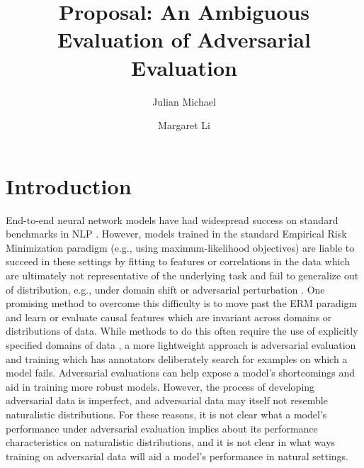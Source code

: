 \documentclass[10pt,a4paper]{article}
\title{Proposal: An Ambiguous Evaluation of Adversarial Evaluation}
\author{Julian Michael}
\author{Margaret Li}
\affil{CSE 599: Empirical Foundations of Machine Learning \\
Paul G. Allen School of Computer Science \& Engineering, University of Washington \texttt{\{julianjm,margsli\}@cs.washington.edu}}
\date{}
\newcommand{\eg}{e.g.}
\begin{document}
\maketitle


\section*{Introduction}
End-to-end neural network models have had widespread success on standard benchmarks in NLP
\citep{wang2018glue,wang2019superglue,lee2017end,dozat2017deep}.
However, models trained in the standard Empirical Risk Minimization paradigm (\eg, using
maximum-likelihood objectives) are liable to succeed in these settings by fitting to features or
correlations in the data which are ultimately not representative of the underlying task and fail to
generalize out of distribution, \eg, under domain shift or adversarial perturbation
\citep{gururangan2018annotation,ilyas-etal-2019-adversarial}.
One promising method to overcome this difficulty is to move past the ERM paradigm and learn or
evaluate causal features which are invariant across domains or distributions of data.
While methods to do this often require the use of explicitly specified domains of data
\citep{peters-etal-2016-causal,arjovsky-etal-2020-invariant},
a more lightweight approach is adversarial evaluation and training
\citep{nie-etal-2020-adversarial,kiela-etal-2021-dynabench} which has annotators deliberately search
for examples on which a model fails.
Adversarial evaluations can help expose a model's shortcomings
and aid in training
more robust models.
However, the process of developing adversarial data is imperfect, and adversarial data may itself
not resemble naturalistic distributions.
For these reasons, it is not clear what a model's performance under adversarial evaluation implies
about its performance characteristics on naturalistic distributions,
and it is not clear in what ways training on adversarial data will aid a model's performance in
natural settings.
\end{document}
